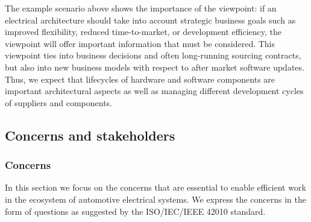 The example scenario above shows the importance of the  viewpoint: if an electrical architecture should take into account strategic business goals such as improved flexibility, reduced time-to-market, or development efficiency, the  viewpoint will offer important information that must be considered.
This viewpoint ties into business decisions and often long-running sourcing contracts, but also into new business models with respect to after market software updates.
Thus, we expect that lifecycles of hardware and software components are important architectural aspects as well as managing different development cycles of suppliers and components.


\subsection{Concerns and stakeholders} 


\subsubsection{Concerns}\label{vp:concerns}
In this section we focus on the concerns that are essential to enable efficient work in the ecosystem of automotive electrical systems. 
We express the concerns in the form of questions as suggested by the ISO/IEC/IEEE 42010 standard.

